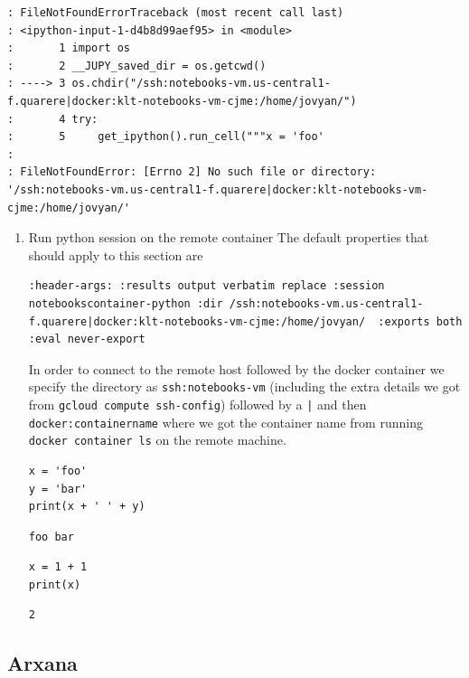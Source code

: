 \documentclass[11pt]{article}
\begin{document}
\begin{verbatim}
: FileNotFoundErrorTraceback (most recent call last)
: <ipython-input-1-d4b8d99aef95> in <module>
:       1 import os
:       2 __JUPY_saved_dir = os.getcwd()
: ----> 3 os.chdir("/ssh:notebooks-vm.us-central1-f.quarere|docker:klt-notebooks-vm-cjme:/home/jovyan/")
:       4 try:
:       5     get_ipython().run_cell("""x = 'foo'
:
: FileNotFoundError: [Errno 2] No such file or directory: '/ssh:notebooks-vm.us-central1-f.quarere|docker:klt-notebooks-vm-cjme:/home/jovyan/'
\end{verbatim}

\begin{enumerate}
\item Run python session on the remote container
\label{sec:orgf02b483}
The default properties that should apply to this section are

\begin{verbatim}
:header-args: :results output verbatim replace :session notebookscontainer-python :dir /ssh:notebooks-vm.us-central1-f.quarere|docker:klt-notebooks-vm-cjme:/home/jovyan/  :exports both  :eval never-export
\end{verbatim}

In order to connect to the remote host followed by the docker container we specify the directory as \texttt{ssh:notebooks-vm} (including the extra details we got from \texttt{gcloud compute ssh-config}) followed by a \texttt{|} and then \texttt{docker:containername} where we got the container name from running \texttt{docker container ls} on the remote machine.

\begin{verbatim}
x = 'foo'
y = 'bar'
print(x + ' ' + y)
\end{verbatim}

\begin{verbatim}
foo bar
\end{verbatim}


\begin{verbatim}
x = 1 + 1
print(x)
\end{verbatim}

\begin{verbatim}
2
\end{verbatim}
\end{enumerate}
\subsection{Arxana}
\label{sec:org5542a17}
\end{document}
